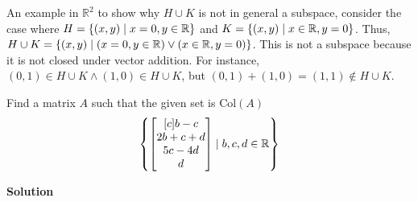 \documentclass[11pt]{scrartcl}
\theoremstyle{dotlessP}
\theoremstyle{dotlessN}
\DeclarePairedDelimiter\set{\{}{\}}
\newcommand{\unite}{\cup}
\newcommand{\reals}{\mathbb{R}} %
\newcommand{\col}{\text{Col}}
\begin{document}
An example in $\reals^2$ to show why $H \unite K$ is not in general a subspace, consider the case where $H = \set*{(x,y) \mid x = 0, y \in \reals}$ and $K = \set*{(x,y) \mid x \in \reals, y = 0}$. Thus,  $H \unite K = \set*{(x,y) \mid (x = 0, y \in \reals) \lor (x \in \reals, y = 0)}$. This is not a subspace because it is not closed under vector addition. For instance, $(0,1) \in H \unite K \land (1,0) \in H \unite K$, but $(0,1) + (1,0) = (1,1) \not\in H \unite K$.
\begin{ques}
	Find a matrix $A$ such that the given set is $\col (A)$
	\[
		\set*{
			\begin{bmatrix}[c]
	b - c \\
	2b + c + d \\
	5c - 4d \\
	d
\end{bmatrix} \mid
b,c,d \in \reals
		}
	\] 
\end{ques}
\textbf{Solution}
\end{document}
